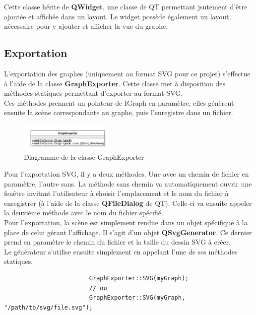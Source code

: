 \documentclass[french]{article}
\begin{document}
			Cette classe hérite de \textbf{QWidget}, une classe de QT permettant jsutement d'être ajoutée et affichée dans un layout. Le widget possède également un layout, nécessaire pour y ajouter et afficher la vue du graphe.
		
		\subsection{Exportation}
			L'exportation des graphes (uniquement au format SVG pour ce projet) s'effectue à l'aide de la classe \textbf{GraphExporter}. Cette classe met à disposition des méthodes statiques permettant d'exporter au format SVG. \\
			Ces méthodes prennent un pointeur de IGraph en paramètre, elles génèrent ensuite la scène correspondante au graphe, puis l'enregistre dans un fichier.
			
			\begin{figure}[H]
				\centering
				\includegraphics[width=0.4\textwidth]{Conception/visualization/graphexporter.png}
				\caption{Diagramme de la classe GraphExporter}
			\end{figure}
			
			Pour l'exportation SVG, il y a deux méthodes. Une avec un chemin de fichier en paramètre, l'autre sans. La méthode sans chemin va automatiquement ouvrir une fenêtre invitant l'utilisateur à choisir l'emplacement et le nom du fichier à enregistrer (à l'aide de la classe \textbf{QFileDialog} de QT). Celle-ci va ensuite appeler la deuxième méthode avec le nom du fichier spécifié. \\
			Pour l'exportation, la scène est simplement rendue dans un objet spécifique à la place de celui gérant l'affichage. Il s'agit d'un objet \textbf{QSvgGenerator}. Ce dernier prend en paramètre le chemin du fichier et la taille du dessin SVG à créer. \\
			
			Le générateur s'utilise ensuite simplement en appelant l'une de ses méthodes statiques.
		
			\begin{lstlisting}
						GraphExporter::SVG(myGraph);
						// ou
						GraphExporter::SVG(myGraph, "/path/to/svg/file.svg");
			\end{lstlisting}
		
\end{document}
